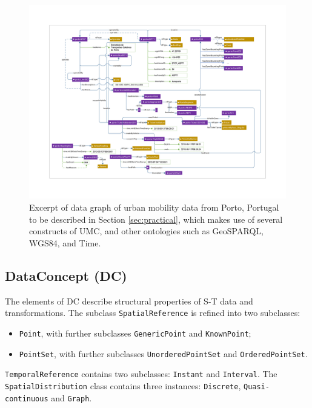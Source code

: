 \documentclass[]{interact}
\theoremstyle{plain}%
\theoremstyle{definition}
\theoremstyle{remark}
\theoremstyle{definition}
\begin{document}
\begin{figure}
	\centering
	\includegraphics[width=1\linewidth]{images/rdf2}
	\caption{Excerpt of data graph of urban mobility data from Porto, Portugal to be described in Section \ref{sec:practical}, which makes use of several constructs of UMC, and other ontologies such as GeoSPARQL, WGS84, and Time.}
	\label{fig:rdfgraph}
\end{figure}








\subsection{DataConcept (DC)}
\label{sec:dc}

The elements of DC describe structural properties of S-T data and transformations. The subclass \texttt{SpatialReference} is refined into two subclasses:

\begin{itemize}
 \item \texttt{Point}, with further subclasses \texttt{GenericPoint} and \texttt{KnownPoint};
 \item \texttt{PointSet}, with further subclasses \texttt{UnorderedPointSet} and \texttt{OrderedPointSet}.
\end{itemize}

 \texttt{TemporalReference} contains two subclasses: \texttt{Instant} and \texttt{Interval}. The \texttt{Spatial\-Dis\-trib\-ution} class contains three instances: \texttt{Discrete}, \texttt{Quasi-continuous} and \texttt{Graph}.
\end{document}
